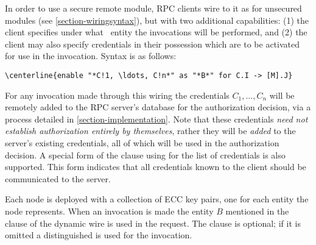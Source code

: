 In order to use a secure remote module, RPC clients wire to it as for
unsecured modules (see \autoref{section-wiringsyntax}), but with two
additional capabilities: (1) the client specifies under what
\RT\ entity the invocations will be performed, and (2) the client may
also specify credentials in their possession which are to be activated
for use in the invocation. Syntax is as follows:
\begin{Verbatim}[commandchars=\\\{\}, codes={\catcode`*=3\catcode`!=8}]
\centerline{enable "*C!1, \ldots, C!n*" as "*B*" for C.I -> [M].J}
\end{Verbatim}
For any invocation made through this wiring the credentials $C_1,
\ldots, C_n$ will be remotely added to the RPC server's database for the
authorization decision, via a process detailed in
\autoref{section-implementation}. Note that these credentials
\emph{need not establish authorization entirely by themselves}, rather
they will be \emph{added} to the server's existing credentials, all of
which will be used in the authorization decision. A special form of the
 clause using  for the list of credentials is
also supported. This form indicates that all credentials known to the
client should be communicated to the server.

Each node is deployed with a collection of ECC key pairs, one for each
entity the node represents. When an invocation is made the entity $B$
mentioned in the  clause of the dynamic wire is used in the
request. The  clause is optional; if it is omitted a
distinguished  is used for the invocation.


